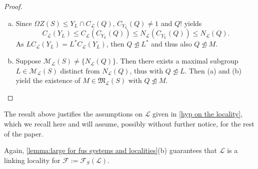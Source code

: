 \documentclass{amsart}
\numberwithin{equation}{section}
\theoremstyle{definition}
\theoremstyle{subresult}
\theoremstyle{caseresult}
\newcommand{\F}{\mathcal{F}}
\newcommand{\M}{\mathcal{M}}
\newcommand{\gM}{\mathfrak{M}}
\renewcommand{\L}{\mathcal{L}}
\newcommand{\norm}{\trianglelefteq}
\newcommand{\<}{\langle}
\renewcommand{\>}{\rangle}
\begin{document}
\begin{proof}
\begin{enumerate}[(a)]
		Let $M_0 := N_M(C_S(Y_M))$; it is clearly a parabolic subgroup of $\L$. Since $C_\L(Y_F)=C_F(Y_F)$, the Frattini argument applied to $C_S(Y_F)\le C_F(Y_F) \norm F =M^\dagger$ yields
		\[
		F=C_F(Y_F) N_F(C_S(Y_F)) = C_F(Y_M)N_M(C_S(Y_M))= M_0 C_F(Y_F).
		\]
		The minimality of $M$ now shows $M_0=M$. Thus $C_S(Y_M)$, which is a Sylow $p$-subgroup of $C_M(Y_M)$, is normal in $C_M(Y_M)$; hence $C_M(Y_M)$ is $p$-closed with Sylow $p$-subgroup $C_S(Y_M)=O_p(M)$, which follows from $Y_M$ being $p$-reduced.\\
		Let now $X$ be a maximal subgroup of $M$ with $O_p(M) \le X$ and suppose $XC_M(Y_M) = M$. Then $F=MC_F(Y_F) = X C_M(Y_F) C_F(Y_F) = X C_F(Y_F)$. Note that $X$ contains a Sylow $p$-subgroup of $M$, as $XC_M(Y_M)=M$, and we may suppose $S \le X$. This now contradicts the minimality of $M$, thus $XC_M(Y_M) \ne M$, proving $C_M(Y_M) \le X$ which is condition (ii) of the basic property.\\
		
		We have proven then (a) apart from the last statement; since $Y_L=Y_{L^*}$ the claim follows easily from \ref{lemma: L containing Q}(a), recalling that $L^* \le M$ and noting
		\[
		L^\circ = (LC_\L(Y_L))^\circ = (L^*C_\L(Y_L))^\circ = (L^*)^\circ \le M^\circ.
		\]
		\item Since $\Omega Z(S) \le Y_L \cap C_\L(Q)$, $C_{Y_L}(Q) \ne 1$ and $Q!$ yields
		\[
		C_\L(Y_L) \le C_\L(C_{Y_L}(Q)) \le N_\L(C_{Y_L}(Q)) \le N_\L(Q).
		\]
		As $LC_\L(Y_L) = L^*C_\L(Y_L)$, then $Q \not \norm L^*$ and thus also $Q \not \norm M$.
		\item Suppose $\M_\L(S) \ne \{N_\L(Q)\}$. Then there exists a maximal subgroup $L \in \M_\L(S)$ distinct from $N_\L(Q)$, thus with $Q \not \norm L$. Then (a) and (b) yield the existence of $M \in \gM_\L(S)$ with $Q \not \norm M$.
	\end{enumerate}
\end{proof}

The result above justifies the assumptions on $\L$ given in \ref{hyp on the locality}, which we recall here and will assume, possibly without further notice, for the rest of the paper.

\hypothesisLocality*

Again, \ref{lemma:large for fus systems and localities}(b) guarantees that $\L$ is a linking locality for $\F:=\F_S(\L)$. \\
\end{document}
